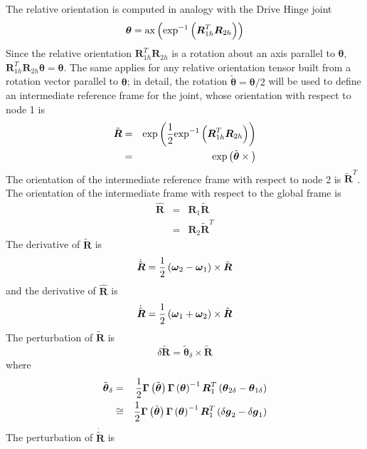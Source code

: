 \documentclass[10pt,dvips]{report}
\newcommand{\T}[1]{\boldsymbol{#1}}
\begin{document}
\noindent
The relative orientation is computed in analogy with the Drive Hinge joint
\begin{equation*}
	\T{\theta} =
	\llk{ax}\plbr{\llk{exp}^{-1}\plbr{\T{R}_{1h}^T \T{R}_{2h}}}
\end{equation*}
Since the relative orientation $\T{R}_{1h}^T \T{R}_{2h}$ is a rotation 
about an axis parallel to $\T{\theta}$,
$\T{R}_{1h}^T \T{R}_{2h}\T{\theta}=\T{\theta}$.
The same applies for any relative orientation tensor built from a rotation
vector parallel to $\T{\theta}$; in detail, the rotation
$\tilde{\T{\theta}}=\T{\theta}/2$
will be used to define an intermediate reference frame for the joint,
whose orientation with respect to node 1 is
\begin{eqnarray*}
	\tilde{\T{R}} & = & \llk{exp}\plbr{\frac{1}{2}\llk{exp}^{-1}\plbr{\T{R}_{1h}^T \T{R}_{2h}}} \\
		& = & \llk{exp}\plbr{\tilde{\T{\theta}}\times{}}
\end{eqnarray*}
The orientation of the intermediate reference frame with respect 
to node 2 is $\tilde{\T{R}}^T$.
The orientation of the intermediate frame with respect
to the global frame is
\begin{eqnarray*}
	\hat{\T{R}} & = & \T{R}_1 \tilde{\T{R}} \\
	& = & \T{R}_2 \tilde{\T{R}}^T
\end{eqnarray*}
The derivative of $\tilde{\T{R}}$ is
\begin{equation*}
	\dot{\tilde{\T{R}}} = \frac{1}{2}\plbr{\T{\omega}_2 - \T{\omega}_1}\times\tilde{\T{R}}
\end{equation*}
and the derivative of $\hat{\T{R}}$ is
\begin{equation*}
	\dot{\hat{\T{R}}} = \frac{1}{2}\plbr{\T{\omega}_1 + \T{\omega}_2}\times\hat{\T{R}}
\end{equation*}
The perturbation of $\tilde{\T{R}}$ is
\begin{equation*}
	\delta\tilde{\T{R}} = \tilde{\T{\theta}}_{\delta}\times\tilde{\T{R}}
\end{equation*}
where
\begin{eqnarray*}
	\tilde{\T{\theta}}_{\delta} & = & \frac{1}{2}\T{\Gamma}\plbr{\tilde{\T{\theta}}}
		\T{\Gamma}\plbr{\T{\theta}}^{-1} \T{R}_1^T\plbr{\T{\theta}_{2\delta} - \T{\theta}_{1\delta}} \\
	& \cong & \frac{1}{2}\T{\Gamma}\plbr{\tilde{\T{\theta}}}
		\T{\Gamma}\plbr{\T{\theta}}^{-1} \T{R}_1^T\plbr{\delta\T{g}_2 - \delta\T{g}_1}
\end{eqnarray*}
The perturbation of $\dot{\tilde{\T{R}}}$ is
\end{document}
